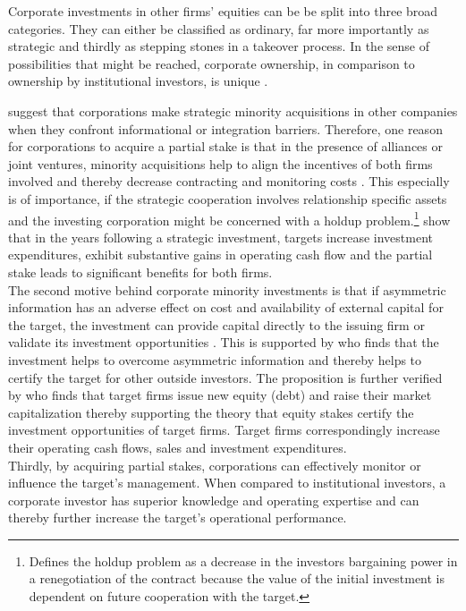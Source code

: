 \documentclass[12pt]{article}
\begin{document}
Corporate investments in other firms' equities can be be split into three broad categories. They can either be classified as ordinary, far more importantly as strategic and thirdly as stepping stones in a takeover process. 
In the sense of possibilities that might be reached, corporate ownership, in comparison to ownership by institutional investors, is unique \citep[p.2791]{Allen2000}.

\citet[p.1]{Huang2017} suggest that corporations make strategic minority acquisitions in other companies when they confront informational or integration barriers. 
Therefore, one reason for corporations to acquire a partial stake is that in the presence of alliances or joint ventures, minority acquisitions help to align the incentives of both firms involved and thereby decrease contracting and monitoring costs \citep[p.2792]{Allen2000}. This especially is of importance, if the strategic cooperation involves relationship specific assets and the investing corporation might be concerned with a holdup problem.\footnote{\citet[p.1023]{Ouimet2013} Defines the holdup problem as a decrease in the investors bargaining power in a renegotiation of the contract because the value of the initial investment is dependent on future cooperation with the target.} \citet[p. 2793]{Allen2000} show that in the years following a strategic investment,  targets increase investment expenditures, exhibit substantive gains in operating cash flow and the partial stake leads to significant benefits for both firms.\\
The second motive behind corporate minority investments is that if asymmetric information has an adverse effect on cost and availability of external capital for the target, the investment can provide capital directly to the issuing firm or validate its investment opportunities \citep[p.2792]{Allen2000}. This is supported by \citet[p.1038]{Ouimet2013} who finds that the investment helps to overcome asymmetric information and thereby helps to certify the target for other outside investors. The proposition is further verified by \citet[p.78]{Liao2014} who finds that target firms issue new equity (debt) and raise their market capitalization thereby supporting the theory that equity stakes certify the investment opportunities of target firms. Target firms correspondingly increase their operating cash flows, sales and investment expenditures.\\ 
Thirdly, by acquiring partial stakes, corporations can effectively monitor or influence the target's management. When compared to institutional investors, a corporate investor has superior knowledge and operating expertise \citep[p.2792]{Allen2000} and can thereby further increase the target's operational performance.\\
\end{document}

